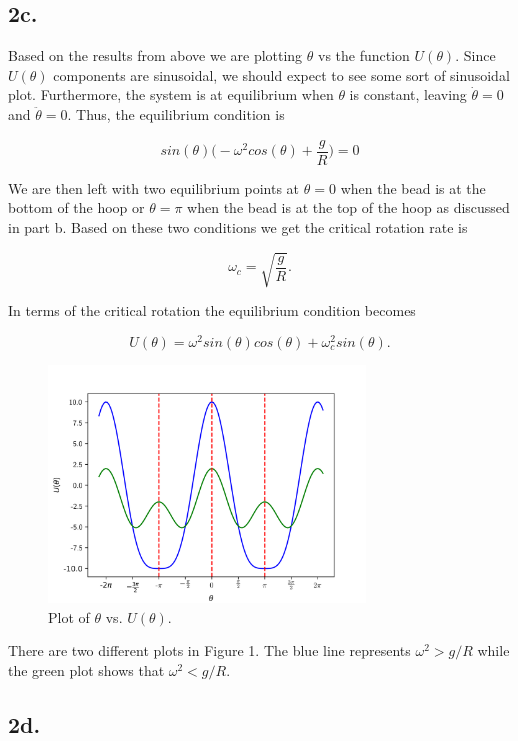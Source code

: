 \documentclass[12pt]{article}
\begin{document}
\subsection*{2c.}

Based on the results from above we are plotting $\theta$ vs the function $U(\theta)$. Since $U(\theta)$ components are sinusoidal, we should expect to see some sort of sinusoidal plot. Furthermore, the system is at equilibrium when $\theta$ is constant, leaving $\dot{\theta} = 0$ and $\ddot{\theta} = 0$. Thus, the equilibrium condition is 

$$
sin(\theta)\Big(-\omega^{2}cos(\theta) + \frac{g}{R}\Big) = 0
$$

We are then left with two equilibrium points at $\theta = 0$ when the bead is at the bottom of the hoop or $\theta = \pi$ when the bead is at the top of the hoop as discussed in part b. Based on these two conditions we get the critical rotation rate is 

$$
\omega_{c} = \sqrt{\frac{g}{R}}.
$$

In terms of the critical rotation the equilibrium condition becomes

$$
U(\theta) = \omega^{2}sin(\theta)cos(\theta) + \omega_{c}^{2}sin(\theta).
$$

\begin{figure}[h]
\caption{Plot of $\theta$ vs. $U(\theta)$.}
\centering
\includegraphics[width=0.75\textwidth]{plot_1.png}
\end{figure}

There are two different plots in Figure 1. The blue line represents $\omega^{2} > g/R$ while the green plot shows that $\omega^{2} < g/R$.

\newpage
\subsection*{2d.}
\end{document}
